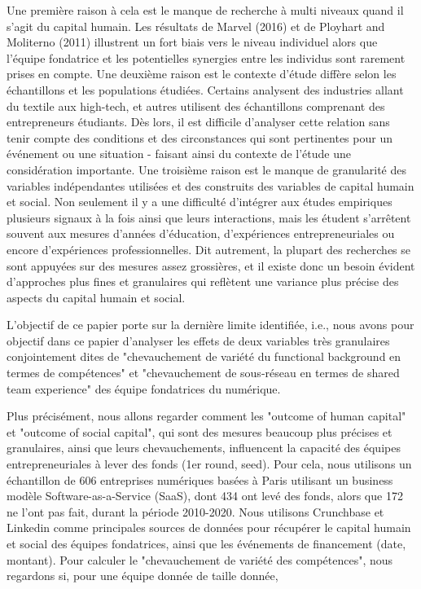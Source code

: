 \documentclass[12pt]{article}
\begin{document}
Une première raison à cela est le manque de recherche à multi niveaux quand il s'agit du capital humain. Les résultats de Marvel (2016) et de Ployhart and Moliterno (2011) illustrent un fort biais vers le niveau individuel alors que l'équipe fondatrice et les potentielles synergies entre les individus sont rarement prises en compte. Une deuxième raison est le contexte d'étude diffère selon les échantillons et les populations étudiées. Certains analysent des industries allant du textile aux high-tech, et autres utilisent des échantillons comprenant des entrepreneurs étudiants. Dès lors, il est difficile d'analyser cette relation sans tenir compte des conditions et des circonstances qui sont pertinentes pour un événement ou une situation - faisant ainsi du contexte de l'étude une considération importante. Une troisième raison est le manque de granularité des variables indépendantes utilisées et des construits des variables de capital humain et social. Non seulement il y a une difficulté d'intégrer aux études empiriques plusieurs signaux à la fois ainsi que leurs interactions, mais les étudent s'arrêtent souvent aux mesures d'années d'éducation, d'expériences entrepreneuriales ou encore d'expériences professionnelles. Dit autrement, la plupart des recherches se sont appuyées sur des mesures assez grossières, et il existe donc un besoin évident d'approches plus fines et granulaires qui reflètent une variance plus précise des aspects du capital humain et social.

L'objectif de ce papier porte sur la dernière limite identifiée, i.e., nous avons pour objectif dans ce papier d'analyser les effets de deux variables très granulaires conjointement dites de "chevauchement de variété du functional background en termes de compétences" et "chevauchement de sous-réseau en termes de shared team experience" des équipe fondatrices du numérique.


Plus précisément, nous allons regarder comment les "outcome of human capital" et "outcome of social capital", qui sont des mesures beaucoup plus précises et granulaires, ainsi que leurs chevauchements, influencent la capacité des équipes entrepreneuriales à lever des fonds (1er round, seed). Pour cela, nous utilisons un échantillon de 606 entreprises numériques basées à Paris utilisant un business modèle Software-as-a-Service (SaaS), dont 434 ont levé des fonds, alors que 172 ne l'ont pas fait, durant la période 2010-2020. Nous utilisons Crunchbase et Linkedin comme principales sources de données pour récupérer le capital humain et social des équipes fondatrices, ainsi que les événements de financement (date, montant). Pour calculer le "chevauchement de variété des compétences", nous regardons si, pour une équipe donnée de taille donnée,
\end{document}
